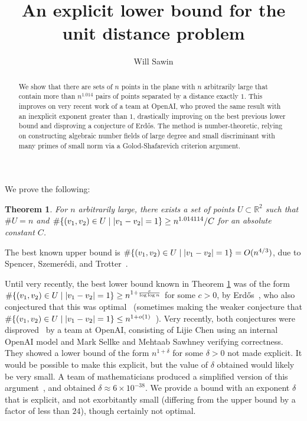\documentclass[12pt]{amsart}
\newtheorem{theo}{Theorem}
\theoremstyle{remark}
\theoremstyle{definition}
\begin{document}
\title{An explicit lower bound for the unit distance problem}

\author{Will Sawin}

\maketitle

\begin{abstract} We show that there are sets of $n$ points in the plane with $n$ arbitrarily large that contain more than $n^{1.014}$ pairs of points separated by a distance exactly $1$. This improves on very recent work of a team at OpenAI, who proved the same result with an inexplicit exponent greater than $1$, drastically improving on the best previous lower bound and disproving a conjecture of Erd\H{o}s. The method is number-theoretic, relying on constructing algebraic number fields of large degree and small discriminant with many primes of small norm via a Golod-Shafarevich criterion argument.  \end{abstract}

We prove the following:

\begin{theo}\label{main} For $n$ arbitrarily large, there exists a set of points $U \subset \mathbb R^2$ such that $\# U = n$ and $\# \{ (v_1,v_2) \in U \mid \abs{v_1-v_2}=1\} \geq n^{1.014114}/C$ for an absolute constant $C$. \end{theo}

The best known upper bound is $\# \{ (v_1,v_2) \in U \mid \abs{v_1-v_2}=1\}  = O(n^{4/3})$, due to Spencer, Szemerédi, and Trotter~\cite{Spencer1983}.

Until very recently, the best lower bound known in Theorem \ref{main} was of the form $\# \{ (v_1,v_2) \in U \mid \abs{v_1-v_2}=1\} \geq n^{1+ \frac{c}{\log \log n}}$ for some $c>0$,  by Erd\H{o}s~\cite[Theorem 2]{Erdos1946}, who also conjectured that this was optimal~\cite[p. 267]{Erdos1994} (sometimes making the weaker conjecture that $\# \{ (v_1,v_2) \in U \mid \abs{v_1-v_2}=1\} \leq n^{1+o(1)}$~\cite[p. 62]{Erds1982}). Very recently, both conjectures were disproved~\cite{machinewriteup} by a team at OpenAI, consisting of Lijie Chen using an internal OpenAI model and Mark Sellke and Mehtaab Sawhney verifying correctness.
They showed a lower bound of the form $n^{1+\delta}$ for some $\delta>0$ not made explicit. It would be possible to make this explicit, but the value of $\delta$ obtained would likely be very small. A team of mathematicians produced a simplified version of this argument~\cite{humanwriteup}, and obtained $\delta \approx 6 \times 10^{-38}$. We provide a bound with an exponent $\delta$ that is explicit, and not exorbitantly small (differing from the upper bound by a factor of less than $24$), though certainly not optimal.
\end{document}

